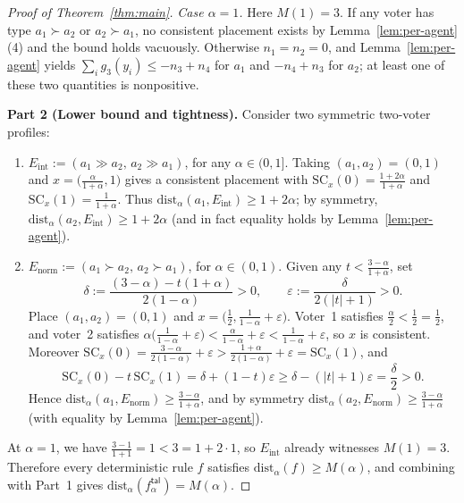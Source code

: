 \documentclass[11pt]{article}
\begin{document}
\begin{proof}[Proof of Theorem~\ref{thm:main}]
\emph{Case $\alpha = 1$.} Here $M(1) = 3$. If any voter has type
$a_1 \succ a_2$ or $a_2 \succ a_1$, no consistent placement exists by
Lemma~\ref{lem:per-agent}(4) and the bound holds vacuously. Otherwise
$n_1 = n_2 = 0$, and Lemma~\ref{lem:per-agent} yields
$\sum_i g_3(y_i) \le -n_3 + n_4$ for $a_1$ and $-n_4 + n_3$ for $a_2$; at least
one of these two quantities is nonpositive.

\medskip
\noindent\textbf{Part 2 (Lower bound and tightness).}
Consider two symmetric two-voter profiles:
\begin{enumerate}
\item $E_{\mathrm{int}} := (a_1 \gg a_2,\, a_2 \gg a_1)$, for any
$\alpha \in (0, 1]$. Taking $(a_1, a_2) = (0, 1)$ and
$x = \bigl(\frac{\alpha}{1 + \alpha}, 1\bigr)$ gives a consistent placement
with $\mathrm{SC}_x(0) = \frac{1 + 2\alpha}{1 + \alpha}$ and
$\mathrm{SC}_x(1) = \frac{1}{1 + \alpha}$. Thus
$\mathrm{dist}_\alpha(a_1, E_{\mathrm{int}}) \ge 1 + 2\alpha$; by symmetry,
$\mathrm{dist}_\alpha(a_2, E_{\mathrm{int}}) \ge 1 + 2\alpha$ (and in fact
equality holds by Lemma~\ref{lem:per-agent}).
\item $E_{\mathrm{norm}} := (a_1 \succ a_2,\, a_2 \succ a_1)$, for
$\alpha \in (0, 1)$. Given any $t < \frac{3 - \alpha}{1 + \alpha}$, set
\[
\delta := \frac{(3 - \alpha) - t(1 + \alpha)}{2(1 - \alpha)} > 0, \qquad
\varepsilon := \frac{\delta}{2(|t| + 1)} > 0.
\]
Place $(a_1, a_2) = (0, 1)$ and
$x = \bigl(\frac{1}{2}, \frac{1}{1 - \alpha} + \varepsilon\bigr)$. Voter~1
satisfies $\frac{\alpha}{2} < \frac{1}{2} = \frac{1}{2}$, and voter~2 satisfies
$\alpha\bigl(\frac{1}{1 - \alpha} + \varepsilon\bigr) < \frac{\alpha}{1 - \alpha} + \varepsilon < \frac{1}{1 - \alpha} + \varepsilon$,
so $x$ is consistent. Moreover
$\mathrm{SC}_x(0) = \frac{3 - \alpha}{2(1 - \alpha)} + \varepsilon >
\frac{1 + \alpha}{2(1 - \alpha)} + \varepsilon = \mathrm{SC}_x(1)$, and
\[
\mathrm{SC}_x(0) - t\,\mathrm{SC}_x(1) = \delta + (1 - t)\varepsilon
\ge \delta - (|t| + 1)\varepsilon = \frac{\delta}{2} > 0.
\]
Hence $\mathrm{dist}_\alpha(a_1, E_{\mathrm{norm}}) \ge \frac{3 - \alpha}{1 + \alpha}$,
and by symmetry $\mathrm{dist}_\alpha(a_2, E_{\mathrm{norm}}) \ge \frac{3 - \alpha}{1 + \alpha}$
(with equality by Lemma~\ref{lem:per-agent}).
\end{enumerate}
At $\alpha = 1$, we have $\frac{3 - 1}{1 + 1} = 1 < 3 = 1 + 2\cdot 1$, so
$E_{\mathrm{int}}$ already witnesses $M(1) = 3$. Therefore every deterministic
rule $f$ satisfies $\mathrm{dist}_\alpha(f) \ge M(\alpha)$, and combining with
Part~1 gives $\mathrm{dist}_\alpha(f^{\mathsf{tal}}_\alpha) = M(\alpha)$.
\end{proof}
\end{document}
